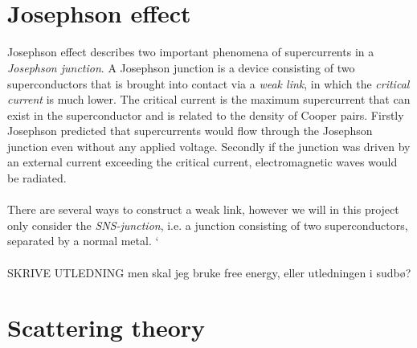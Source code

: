 \\
\\

\section{Josephson effect}
Josephson effect describes two important phenomena of supercurrents in a \textit{Josephson junction}. A Josephson junction is a device consisting of two superconductors that is brought into contact via a \textit{weak link}, in which the \textit{critical current} is much lower. The critical current is the maximum supercurrent that can exist in the superconductor and is related to the density of Cooper pairs. 
Firstly Josephson predicted \cite{josephson62} that supercurrents would flow through the Josephson junction even without any applied voltage. Secondly if the junction was driven by an external current exceeding the critical current, electromagnetic waves would be radiated.
\\
\\
There are several ways to construct a weak link, however we will in this project only consider the \textit{SNS-junction}, i.e. a junction consisting of two superconductors, separated by a normal metal.
`\\
\\
SKRIVE UTLEDNING
men skal jeg bruke free energy, eller utledningen i sudbø?

\section{Scattering theory}


